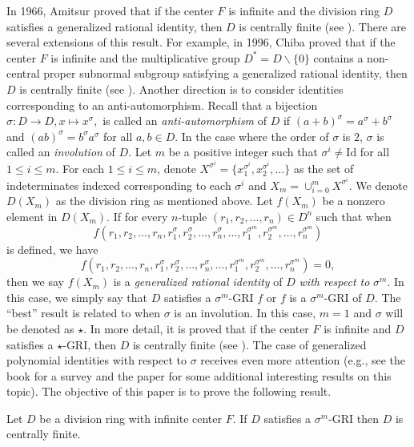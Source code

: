 \documentclass{cimart}
\begin{document}
In 1966, Amitsur proved that if the center $F$ is infinite and the division ring $D$ satisfies a generalized rational identity, then $D$ is centrally finite (see \cite{s1}). There are several extensions of this result. For example, in 1996, Chiba proved that if the center $F$ is infinite and the multiplicative group $D^*=D\backslash \{0\}$ contains a non-central proper subnormal subgroup satisfying a generalized rational identity, then $D$ is centrally finite (see \cite{chiba_96}). Another direction is to consider identities corresponding to an anti-automorphism. Recall that a bijection $\sigma : D\to D, x\mapsto x^\sigma,$ is called an \textit{anti-automorphism} of $D$ if $(a+b)^\sigma=a^\sigma+b^\sigma$ and $(ab)^\sigma=b^\sigma a^\sigma$ for all $a,b\in D$. In the case where the order of $\sigma$ is $2$, $\sigma$ is called an \textit{involution} of $D$. Let $m$ be a positive integer such that $\sigma^i\neq \mathrm{Id}$ for all $1\leq i\leq m$. For each $1\leq i\leq m$, denote $X^{\sigma^i}=\{x_1^{\sigma^i},x_2^{\sigma^i},\dots\}$ as the set of indeterminates indexed corresponding to each $\sigma^i$ and $X_m=\cup_{i=0}^mX^{\sigma^i}$. We denote $D(X_m)$ as the division ring as mentioned above. Let $f(X_m)$ be a nonzero element in $D(X_m)$. If for every $n$-tuple $(r_1,r_2,\dots,r_n)\in D^n$ such that when $$f(r_1,r_2,\dots,r_n,r_1^\sigma,r_2^\sigma,\dots,r_n^\sigma,\dots,r_1^{\sigma^m},r_2^{\sigma^m},\dots,r_n^{\sigma^m})$$ is defined, we have $$f(r_1,r_2,\dots,r_n,r_1^\sigma,r_2^\sigma,\dots,r_n^\sigma,\dots,r_1^{\sigma^m},r_2^{\sigma^m},\dots,r_n^{\sigma^m})=0,$$ then we say $f(X_m)$ is a \textit{generalized rational identity} of $D$ \textit{with respect to} $\sigma^m$. In this case, we simply say that $D$ satisfies a $\sigma^m$-GRI $f$ or $f$ is a $\sigma^m$-GRI of $D$. The ``best'' result is related to when $\sigma$ is an involution. In this case, $m=1$ and $\sigma$ will be denoted as $\star$. In more detail, it is proved that if the center $F$ is infinite and $D$ satisfies a $\star$-GRI, then $D$ is centrally finite (see \cite{Pa_Des}). The case of generalized polynomial identities with respect to $\sigma$ receives even more attention (e.g., see the book \cite{k} for a survey and the paper \cite{swain} for some additional interesting results on this topic). The objective of this paper is to prove the following result.

\begin{theorem}\label{main}
	Let $D$ be a division ring with  infinite center $F$. If $D$ satisfies a $\sigma^m$-GRI then $D$ is centrally finite. 
\end{theorem}
\end{document}
